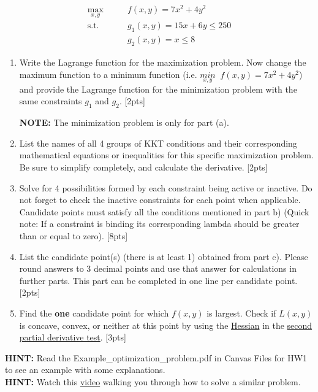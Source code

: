 \documentclass{article}
\begin{document}
\begin{align*}
    \max_{x,y} \qquad & f(x,y) = 7x^{2} + 4y^{2} \\
    \text{s.t.} \qquad & g_{1}(x,y) = 15x+6y\leq 250 \\
    & g_{2}(x,y) =  x \leq 8
\end{align*}

\begin{enumerate}[label=(\alph*)]
    \item Write the Lagrange function for the maximization problem. Now change the maximum function to a minimum function (i.e. $\underset{x,y}{min} \;\; f(x,y) = 7x^{2} + 4y^{2}$) and provide the Lagrange function for the minimization problem with the same constraints $g_1$ and $g_2$.  [2pts]
        \par\textbf{NOTE:} The minimization problem is only for part (a).
    \item List the names of all 4 groups of KKT conditions and their corresponding mathematical equations or inequalities for this specific maximization problem. Be sure to simplify completely, and calculate the derivative. [2pts]

\item Solve for 4 possibilities formed by each constraint being active or inactive. Do not forget to check the inactive constraints for each point when applicable. Candidate points must satisfy all the conditions mentioned in part b) (Quick note: If a constraint is binding its corresponding lambda should be greater than or equal to zero).   [8pts]
    \item List the candidate point(s) (there is at least 1) obtained from part c). Please round answers to 3 decimal points and use that answer for calculations in further parts. This part can be completed in one line per candidate point. [2pts]
    \item Find the \textbf{one} candidate point for which $f(x,y)$ is largest. Check if $L(x,y)$ is concave, convex, or neither at this point by using the \href{https://www.khanacademy.org/math/multivariable-calculus/applications-of-multivariable-derivatives/quadratic-approximations/a/the-hessian}{Hessian} in the \href{https://www.khanacademy.org/math/multivariable-calculus/applications-of-multivariable-derivatives/optimizing-multivariable-functions/a/second-partial-derivative-test}{second partial derivative test}.  [3pts]
\end{enumerate}

\noindent\textbf{HINT:} Read the Example\_optimization\_problem.pdf in Canvas Files for HW1 to see an example with some explanations. \\
\noindent\textbf{HINT:} Watch this \href{https://youtu.be/pR3vGVjzrFs}{video} walking you through how to solve a similar problem.\\
\end{document}
